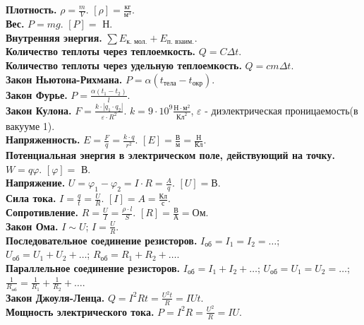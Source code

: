 \documentclass[12pt]{article}
\begin{document}
	\tableofcontents
	\setcounter{tocdepth}{3}
	\newpage
	\noindent
	\textbf{Плотность.} $\rho = \frac{m}{V}$. $[\rho] = \frac{\text{кг}}{\text{м}^3}$.\\
	\textbf{Вес.} $P = mg$. $[P] =$ Н.\\
	\textbf{Внутренняя энергия.} $\sum E_{\text{к. мол.}} + E_{\text{п. взаим.}}$.\\
	\textbf{Количество теплоты через теплоемкость.} $Q = C \varDelta t$.\\
	\textbf{Количество теплоты через удельную теплоемкость.} $Q = c m \varDelta t$.\\
	\textbf{Закон Ньютона-Рихмана.} $P = \alpha (t_{\text{тела}} - t_{\text{окр}})$.\\
	\textbf{Закон Фурье.} $P = \frac{\alpha (t_1 - t_2)}{l}$.\\
	\textbf{Закон Кулона.} $F = \frac{k \cdot |q_{1} \cdot q_{2}|}{\varepsilon \cdot R^{2}}$. $k = 9 \cdot 10^{9} \frac{\text{Н} \cdot \text{м}^{2}}{\text{Кл}^{2}}$, $\varepsilon$ - диэлектрическая проницаемость(в вакууме 1).\\
	\textbf{Напряженность.} $E = \frac{F}{q} = \frac{k \cdot q}{r^{2}}$. $[E] = \frac{\text{В}}{\text{м}} = \frac{\text{Н}}{\text{Кл}}$.\\
	\textbf{Потенциальная энергия в электрическом поле, действующий на точку.} $W = q \varphi$. $[\varphi] =$ В.\\
	\textbf{Напряжение.} $U = \varphi_{1} - \varphi_{2} = I \cdot R = \frac{A}{q}$. $[U] = \text{В}$.\\
	\textbf{Сила тока.} $I = \frac{q}{t} = \frac{U}{R}$. $[I] = A = \frac{\text{Кл}}{\text{с}}$.\\
	\textbf{Сопротивление.} $R = \frac{U}{I} = \frac{\rho \cdot l}{S}$. $[R] = \frac{\text{В}}{\text{А}} = \text{Ом}$.\\
	\textbf{Закон Ома.} $I \sim U$; $I = \frac{U}{R}$.\\
	\textbf{Последовательное соединение резисторов.} $I_{\text{об}} = I_{1} = I_{2} = \dots$; $U_{\text{об}} = U_{1} + U_{2} + \dots$; $R_{\text{об}} = R_{1} + R_{2} + \dots$.\\
	\textbf{Параллельное соединение резисторов.} $I_{\text{об}} = I_{1} + I_{2} + \dots$; $U_{\text{об}} = U_{1} = U_{2} = \dots$; $\frac{1}{R_{\text{об}}} = \frac{1}{R_{1}} + \frac{1}{R_{2}} + \dots$.\\
	\textbf{Закон Джоуля-Ленца.} $Q = I^2Rt = \frac{U^2t}{R} = IUt$.\\
	\textbf{Мощность электрического тока.} $P = I^2R = \frac{U^2}{R} = IU$.\\
\end{document}
